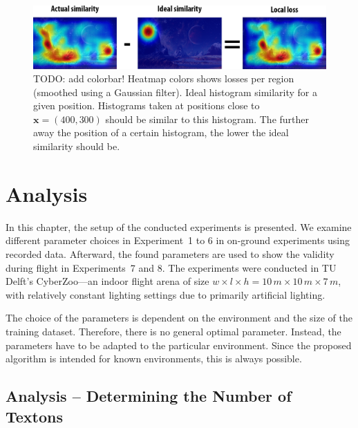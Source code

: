 \documentclass{report}
\begin{document}
\begin{figure}[h!]
\begin{center}
\includegraphics[width=1\columnwidth]{local_loss}
\caption{{TODO: add colorbar! Heatmap colors shows losses per region
    (smoothed using a Gaussian filter). Ideal histogram similarity for
    a given position. Histograms taken at positions close to
    $\textbf{x} = (400, 300)$ should be similar to this histogram. The
    further away the position of a certain histogram, the lower the
    ideal similarity should be.%
  }}
\end{center}
\end{figure}

\chapter{Analysis}
\label{chap:analysis}

In this chapter, the setup of the conducted experiments is
presented. We examine different parameter choices in Experiment~1 to 6
in on-ground experiments using recorded data. Afterward, the found
parameters are used to show the validity during flight in
Experiments~7 and 8. The experiments were conducted in TU Delft's
CyberZoo---an indoor flight arena of size
$w \times l \times h = 10\,m \times10\,m \times 7\,m$, with relatively
constant lighting settings due to primarily artificial lighting.

The choice of the parameters is dependent on the environment and the
size of the training dataset. Therefore, there is no general optimal
parameter. Instead, the parameters have to be adapted to the
particular environment. Since the proposed algorithm is intended for
known environments, this is always possible.

\section{Analysis -- Determining the Number of Textons}
\label{sec:numtextons}
\end{document}

